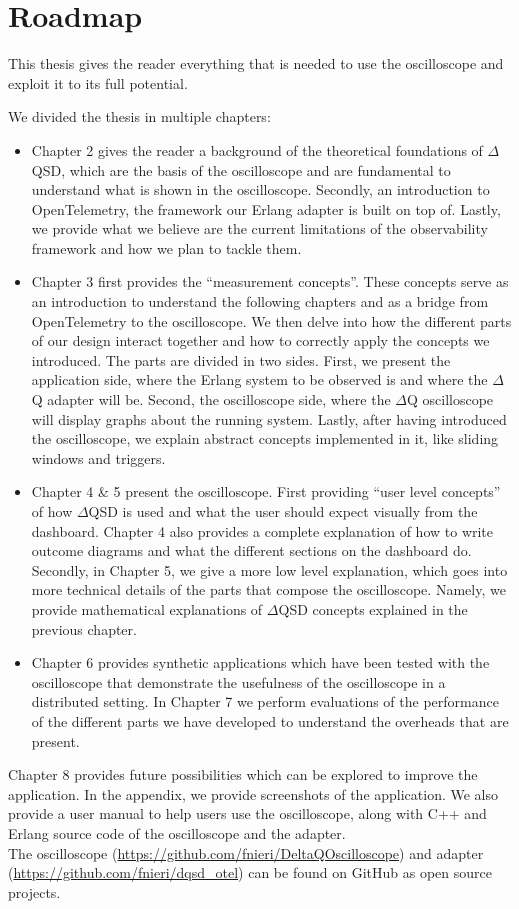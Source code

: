 \section{Roadmap}
    This thesis gives the reader everything that is needed to use the oscilloscope and exploit it to its full potential.

    We divided the thesis in multiple chapters:
    \begin{itemize}
        \item Chapter 2 gives the reader a background of the theoretical foundations of $\Delta$QSD, which are the basis of the oscilloscope and are fundamental to understand what is shown in the oscilloscope. Secondly, an introduction to OpenTelemetry, the framework our Erlang adapter is built on top of. Lastly, we provide what we believe are the current limitations of the observability framework and how we plan to tackle them.
        \item Chapter 3 first provides the ``measurement concepts''. These concepts serve as an introduction to understand the following chapters and as a bridge from OpenTelemetry to the oscilloscope.  We then delve into how the different parts of our design interact together and how to correctly apply the concepts we introduced. The parts are divided in two sides. First, we present the application side, where the Erlang system to be observed is and where the $\Delta$Q adapter will be. Second, the oscilloscope side, where the $\Delta$Q oscilloscope will display graphs about the running system. Lastly, after having introduced the oscilloscope, we explain abstract concepts implemented in it, like sliding windows and triggers.
        \item Chapter 4 \& 5 present the oscilloscope. First providing ``user level concepts'' of how $\Delta$QSD is used and what the user should expect visually from the dashboard. Chapter 4 also provides a complete explanation of how to write outcome diagrams and what the different sections on the dashboard do.
            Secondly, in Chapter 5, we give a more low level explanation, which goes into more technical details of the parts that compose the oscilloscope. Namely, we provide mathematical explanations of $\Delta$QSD concepts explained in the previous chapter.
        \item Chapter 6 provides synthetic applications which have been tested with the oscilloscope that demonstrate the usefulness of the oscilloscope in a distributed setting. In Chapter 7 we perform evaluations of the performance of the different parts we have developed to understand the overheads that are present.
    \end{itemize}

    Chapter 8 provides future possibilities which can be explored to improve the application. In the appendix, we provide screenshots of the application. We also provide a user manual to help users use the oscilloscope, along with C++ and Erlang source code of the oscilloscope and the adapter. \\
   \sloppy The oscilloscope (\url{https://github.com/fnieri/DeltaQOscilloscope}) and adapter (\url{https://github.com/fnieri/dqsd_otel}) can be found on GitHub as open source projects.
